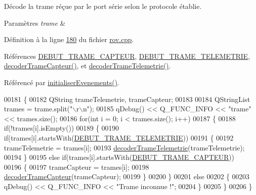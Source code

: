 Décode la trame réçue par le port série selon le protocole établie. 


\begin{DoxyParams}{Paramètres}
{\em trame} & \\
\hline
\end{DoxyParams}


Définition à la ligne \hyperlink{rov_8cpp_source_l00180}{180} du fichier \hyperlink{rov_8cpp_source}{rov.\+cpp}.



Références \hyperlink{rov_8h_source_l00028}{D\+E\+B\+U\+T\+\_\+\+T\+R\+A\+M\+E\+\_\+\+C\+A\+P\+T\+E\+UR}, \hyperlink{rov_8h_source_l00022}{D\+E\+B\+U\+T\+\_\+\+T\+R\+A\+M\+E\+\_\+\+T\+E\+L\+E\+M\+E\+T\+R\+IE}, \hyperlink{rov_8cpp_source_l00086}{decoder\+Trame\+Capteur()}, et \hyperlink{rov_8cpp_source_l00081}{decoder\+Trame\+Telemetrie()}.



Référencé par \hyperlink{rov_8cpp_source_l00112}{initialiser\+Evenements()}.


\begin{DoxyCode}
00181 \{
00182     QString trameTelemetrie, trameCapteur;
00183 
00184     QStringList trames = trame.split(\textcolor{stringliteral}{"\(\backslash\)r\(\backslash\)n"});
00185     qDebug() << Q\_FUNC\_INFO << \textcolor{stringliteral}{"trame"} << trames.size();
00186     \textcolor{keywordflow}{for}(\textcolor{keywordtype}{int} i = 0; i < trames.size(); i++)
00187     \{
00188         \textcolor{keywordflow}{if}(!trames[i].isEmpty())
00189         \{
00190             \textcolor{keywordflow}{if}(trames[i].startsWith(\hyperlink{rov_8h_aa4d7955cdbd3d56086855ed938b980d1}{DEBUT\_TRAME\_TELEMETRIE}))
00191             \{
00192                 trameTelemetrie = trames[i];
00193                 \hyperlink{class_rov_a0d51099f9e1991ceffa0b6ed4a1c4e2e}{decoderTrameTelemetrie}(trameTelemetrie);
00194             \}
00195             \textcolor{keywordflow}{else} \textcolor{keywordflow}{if}(trames[i].startsWith(\hyperlink{rov_8h_a224f8acbc025db0e90045ce113761b0f}{DEBUT\_TRAME\_CAPTEUR}))
00196             \{
00197                 trameCapteur = trames[i];
00198                 \hyperlink{class_rov_ac1780c0484f427807f6207d17b564221}{decoderTrameCapteur}(trameCapteur);
00199             \}
00200         \}
00201         \textcolor{keywordflow}{else}
00202         \{
00203             qDebug() << Q\_FUNC\_INFO << \textcolor{stringliteral}{"Trame inconnue !"};
00204         \}
00205     \}
00206 \}
\end{DoxyCode}
\mbox{\label{class_rov_ac1780c0484f427807f6207d17b564221}} 
